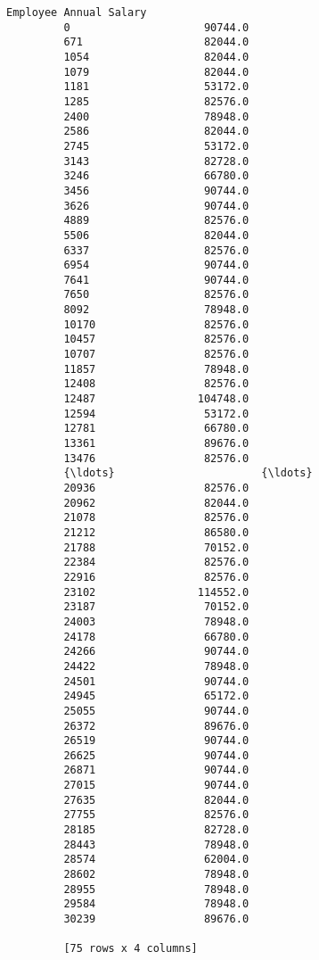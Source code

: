 \documentclass[11pt]{article}
\begin{document}
\begin{Verbatim}[commandchars=\\\{\}]
                Employee Annual Salary  
         0                     90744.0  
         671                   82044.0  
         1054                  82044.0  
         1079                  82044.0  
         1181                  53172.0  
         1285                  82576.0  
         2400                  78948.0  
         2586                  82044.0  
         2745                  53172.0  
         3143                  82728.0  
         3246                  66780.0  
         3456                  90744.0  
         3626                  90744.0  
         4889                  82576.0  
         5506                  82044.0  
         6337                  82576.0  
         6954                  90744.0  
         7641                  90744.0  
         7650                  82576.0  
         8092                  78948.0  
         10170                 82576.0  
         10457                 82576.0  
         10707                 82576.0  
         11857                 78948.0  
         12408                 82576.0  
         12487                104748.0  
         12594                 53172.0  
         12781                 66780.0  
         13361                 89676.0  
         13476                 82576.0  
         {\ldots}                       {\ldots}  
         20936                 82576.0  
         20962                 82044.0  
         21078                 82576.0  
         21212                 86580.0  
         21788                 70152.0  
         22384                 82576.0  
         22916                 82576.0  
         23102                114552.0  
         23187                 70152.0  
         24003                 78948.0  
         24178                 66780.0  
         24266                 90744.0  
         24422                 78948.0  
         24501                 90744.0  
         24945                 65172.0  
         25055                 90744.0  
         26372                 89676.0  
         26519                 90744.0  
         26625                 90744.0  
         26871                 90744.0  
         27015                 90744.0  
         27635                 82044.0  
         27755                 82576.0  
         28185                 82728.0  
         28443                 78948.0  
         28574                 62004.0  
         28602                 78948.0  
         28955                 78948.0  
         29584                 78948.0  
         30239                 89676.0  
         
         [75 rows x 4 columns]
\end{Verbatim}
            
\end{document}
